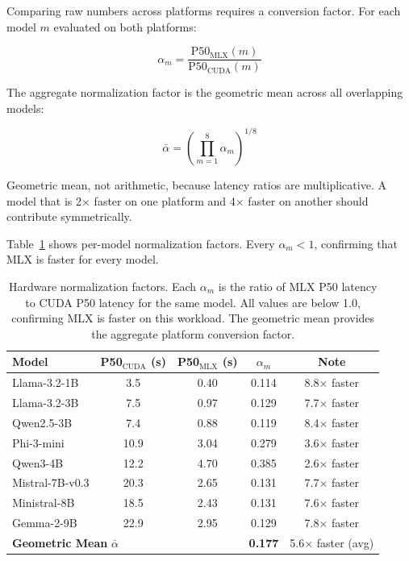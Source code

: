 \documentclass[11pt]{article}
\begin{document}
Comparing raw numbers across platforms requires a conversion factor.  For each model $m$ evaluated on both platforms:

\begin{equation}
\alpha_m = \frac{\text{P50}_{\text{MLX}}(m)}{\text{P50}_{\text{CUDA}}(m)}
\label{eq:normalization}
\end{equation}

The aggregate normalization factor is the geometric mean across all overlapping models:

\begin{equation}
\bar{\alpha} = \left(\prod_{m=1}^{8} \alpha_m \right)^{1/8}
\label{eq:aggregate-norm}
\end{equation}

Geometric mean, not arithmetic, because latency ratios are multiplicative.  A model that is 2$\times$ faster on one platform and 4$\times$ faster on another should contribute symmetrically.

Table~\ref{tab:normalization} shows per-model normalization factors.  Every $\alpha_m < 1$, confirming that MLX is faster for every model.

\begin{table}[t]
\centering
\caption{Hardware normalization factors.  Each $\alpha_m$ is the ratio of MLX P50 latency to CUDA P50 latency for the same model.  All values are below 1.0, confirming MLX is faster on this workload.  The geometric mean provides the aggregate platform conversion factor.}
\label{tab:normalization}
\small
\begin{tabular}{lcccc}
\toprule
\textbf{Model} & \textbf{P50$_{\text{CUDA}}$ (s)} & \textbf{P50$_{\text{MLX}}$ (s)} & \textbf{$\alpha_m$} & \textbf{Note} \\
\midrule
Llama-3.2-1B   & 3.5  & 0.40 & 0.114 & 8.8$\times$ faster \\
Llama-3.2-3B   & 7.5  & 0.97 & 0.129 & 7.7$\times$ faster \\
Qwen2.5-3B     & 7.4  & 0.88 & 0.119 & 8.4$\times$ faster \\
Phi-3-mini      & 10.9 & 3.04 & 0.279 & 3.6$\times$ faster \\
Qwen3-4B        & 12.2 & 4.70 & 0.385 & 2.6$\times$ faster \\
Mistral-7B-v0.3 & 20.3 & 2.65 & 0.131 & 7.7$\times$ faster \\
Ministral-8B    & 18.5 & 2.43 & 0.131 & 7.6$\times$ faster \\
Gemma-2-9B      & 22.9 & 2.95 & 0.129 & 7.8$\times$ faster \\
\midrule
\multicolumn{3}{l}{\textbf{Geometric Mean} $\bar{\alpha}$} & \textbf{0.177} & 5.6$\times$ faster (avg) \\
\bottomrule
\end{tabular}
\end{table}
\end{document}

